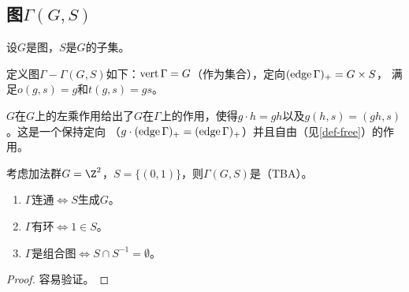 \subsection{图$\Gamma(G,S)$}
设$G$是图，$S$是$G$的子集。
\begin{definition}
    定义图$\Gamma - \Gamma(G,S)$如下：$\operatorname{vert} \Gamma = G$（作为集合），定向$(\operatorname{edge} \Gamma)_+ = G \times S$，
    满足$o(g,s) = g$和$t(g,s) = gs$。
\end{definition}
$G$在$G$上的左乘作用给出了$G$在$\Gamma$上的作用，使得$g\cdot h = gh$以及$g(h,s) = (gh,s)$。这是一个保持定向
（$g\cdot (\operatorname{edge} \Gamma)_+ = (\operatorname{edge} \Gamma)_+$）并且自由（见\ref{def-free}）的作用。
\begin{example}
    考虑加法群$G = \Z^2$，$S = \{(0,1)\}$，则$\Gamma(G,S)$是（TBA）。
\end{example}
\begin{proposition}
    \begin{enumerate}
        \item $\Gamma$连通$\iff S$生成$G$。
        \item $\Gamma$有环$\iff 1 \in S$。
        \item $\Gamma$是组合图$\iff S \cap S^{-1} = \emptyset$。
    \end{enumerate}
\end{proposition}
\begin{proof}
    容易验证。
\end{proof}
